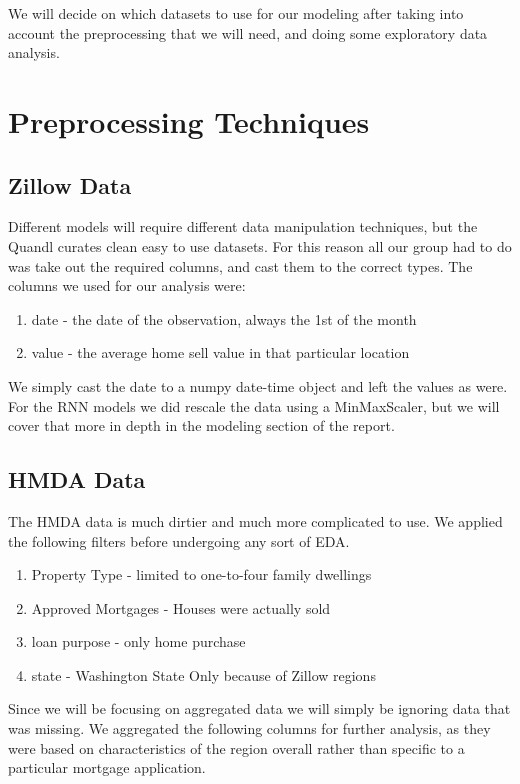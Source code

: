 \documentclass{article}
\begin{document}
	We will decide on which datasets to use for our modeling after taking into account the preprocessing that we will need, and 
	doing some exploratory data analysis. 

	\section{Preprocessing Techniques}
	
	\subsection{Zillow Data}
	
	Different models will require different data manipulation techniques, but the Quandl curates clean easy to use datasets. For this 
	reason all our group had to do was take out the required columns, and cast them to the correct types. The columns we used for 
	our analysis were: 
	
	\begin{enumerate}
		\item date - the date of the observation, always the 1st of the month 
		\item value - the average home sell value in that particular location
		
	\end{enumerate}

	We simply cast the date to a numpy date-time object and left the values as were. For the RNN models we did rescale the data 
	using a MinMaxScaler, but we will cover that more in depth in the modeling section of the report. 
	
	\subsection{HMDA Data}
	The HMDA data is much dirtier and much more complicated to use. We applied the following filters before undergoing any 
	sort of EDA.  
	
	\begin{enumerate}
		\item Property Type - limited to one-to-four family dwellings
		\item Approved Mortgages - Houses were actually sold 
		\item loan purpose - only home purchase 
		\item state - Washington State Only because of Zillow regions
	\end{enumerate}

	Since we will be focusing on aggregated data we will simply be ignoring data that was missing. 	We aggregated the following 
	columns for further analysis, as they were based on characteristics of the region overall rather than specific to a particular 
	mortgage application. 
	
\end{document}
